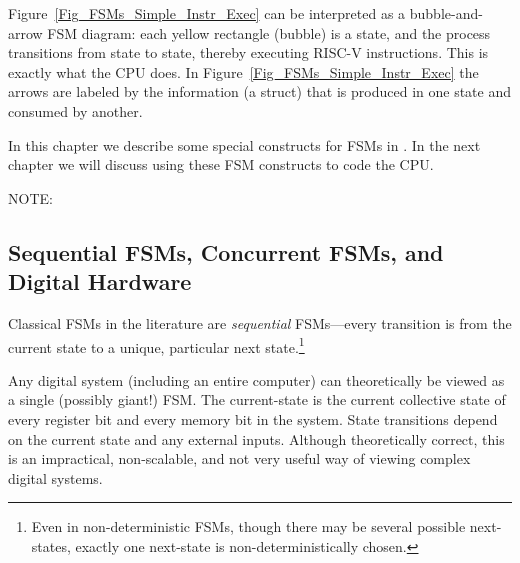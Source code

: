 
Figure~\ref{Fig_FSMs_Simple_Instr_Exec} can be interpreted as a
bubble-and-arrow FSM diagram: each yellow rectangle (bubble) is a
state, and the process transitions from state to state, thereby
executing RISC-V instructions.  This is exactly what the {\DRUM} CPU
does.  In Figure~\ref{Fig_FSMs_Simple_Instr_Exec} the arrows are
labeled by the information (a struct) that is produced in one state
and consumed by another.

In this chapter we describe some special constructs for FSMs in {\BSV}.
In the next chapter we will discuss using these FSM constructs to code
the {\DRUM} CPU.

\vspace{2ex}

NOTE: 


\subsection{Sequential FSMs, Concurrent FSMs, and Digital Hardware}


Classical FSMs in the literature are \emph{sequential} FSMs---every
transition is from the current state to a unique, particular next
state.\footnote{Even in non-deterministic FSMs, though there may be
several possible next-states, exactly one next-state is
non-deterministically chosen.}

Any digital system (including an entire computer) can theoretically be
viewed as a single (possibly giant!) FSM.  The current-state is the
current collective state of every register bit and every memory bit in
the system.  State transitions depend on the current state and any
external inputs.  Although theoretically correct, this is an
impractical, non-scalable, and not very useful way of viewing complex
digital systems.

